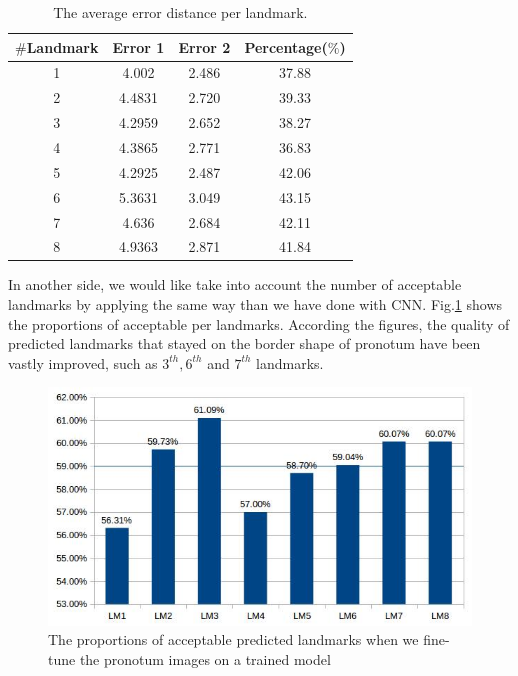 \documentclass[10pt]{article}
\begin{document}
\begin{table}[htbp]
\begin{center}
\begin{tabular}{|c|c|c|c|}
\hline
\textbf{$\#$Landmark} & \textbf{Error 1} & \textbf{Error 2} & \textbf{Percentage($\%$)} \\ \hline
1 & 4.002 & 2.486 & 37.88 \\ \hline
2 & 4.4831 & 2.720 & 39.33 \\ \hline
3 & 4.2959  & 2.652 & 38.27 \\ \hline
4 & 4.3865  & 2.771 & 36.83 \\ \hline
5 & 4.2925  & 2.487 & 42.06 \\ \hline
6 & 5.3631  & 3.049 & 43.15 \\ \hline
7 & 4.636  & 2.684 & 42.11 \\ \hline
8 & 4.9363  & 2.871 & 41.84 \\ \hline
\end{tabular}
\caption{The average error distance per landmark.}
\label{tab2}
\end{center}
\end{table}

In another side, we would like take into account the number of acceptable landmarks by applying the same way than we have done with CNN. Fig.\ref{figchart2} shows the proportions of acceptable per landmarks. According the figures, the quality of predicted landmarks that stayed on the border shape of pronotum have been vastly improved, such as $3^{th}, 6^{th}$ and $7^{th}$ landmarks.

\begin{figure}[htbp]
	\centerline{\includegraphics[scale=0.5]{images/avg_finetune}}
	\caption{The proportions of acceptable predicted landmarks when we fine-tune the pronotum images on a trained model}
	\label{figchart2}
\end{figure}
\end{document}
